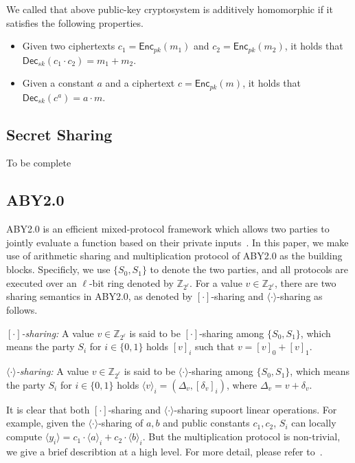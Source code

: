 \documentclass[conference]{IEEEtran}
\begin{document}
We called that above public-key cryptosystem is additively homomorphic if it satisfies the following properties.

\begin{itemize}
  \item Given two ciphertexts $c_1 = \mathsf{Enc}_{pk}(m_1)$ and $c_2 = \mathsf{Enc}_{pk}(m_2)$, it holds that $\mathsf{Dec}_{sk}(c_1 \cdot c_2) = m_1 + m_2$.
  \item Given a constant $a$ and a ciphertext $c=\mathsf{Enc}_{pk}(m)$, it holds that $\mathsf{Dec}_{sk}(c^a) = a\cdot m$.
\end{itemize}

\subsection{Secret Sharing}

To be complete


\iffalse
\subsection{ABY2.0}

ABY2.0 is an efficient mixed-protocol framework which allows two parties to jointly evaluate a function based on their private inputs~\cite{patra_aby20_2020}.
In this paper, we make use of arithmetic sharing and multiplication protocol of ABY2.0 as the building blocks.
Specificly, we use $\{S_0, S_1\}$ to denote the two parties, and all protocols are executed over an $\ell$-bit ring denoted by $\mathbb{Z}_{2^\ell}$.
For a value $v\in\mathbb{Z}_{2^\ell}$, there are two sharing semantics in ABY2.0, as denoted by $[\cdot]$-sharing and $\langle \cdot \rangle$-sharing as follows.

\textit{$[\cdot]$-sharing:} A value $v\in\mathbb{Z}_{2^\ell}$ is said to be $[\cdot]$-sharing among $\{S_0, S_1\}$, which means the party $S_i$ for $i\in\{0,1\}$ holds $[v]_i$ such that $v = [v]_0 + [v]_1$.

\textit{$\langle \cdot \rangle$-sharing:} A value $v\in\mathbb{Z}_{2^\ell}$ is said to be $\langle \cdot \rangle$-sharing among $\{S_0, S_1\}$, which means the party $S_i$ for $i\in\{0,1\}$ holds $\langle v \rangle_i = (\Delta_v, [\delta_v]_i)$, where $\Delta_v = v + \delta_v$.

It is clear that both $[\cdot]$-sharing and $\langle \cdot \rangle$-sharing supoort linear operations.
For example, given the $\langle \cdot \rangle$-sharing of $a,b$ and public constants $c_1,c_2$, $S_i$ can locally compute $\langle y_i \rangle = c_1 \cdot \langle a \rangle_i + c_2 \cdot \langle b \rangle_i$.
But the multiplication protocol is non-trivial, we give a brief describtion at a high level.
For more detail, please refer to~\cite{patra_aby20_2020}.
\end{document}
